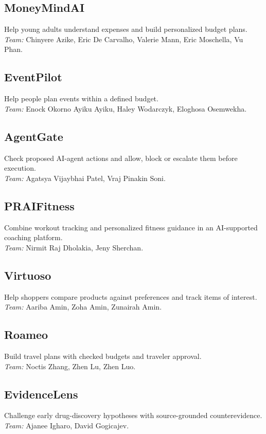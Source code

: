 \documentclass[sigconf,nonacm]{acmart}
\begin{document}
\subsection*{MoneyMindAI}
Help young adults understand expenses and build personalized budget plans.\\
\textit{Team:} Chinyere Azike, Eric De Carvalho, Valerie Mann, Eric Moschella, Vu Phan.

\subsection*{EventPilot}
Help people plan events within a defined budget.\\
\textit{Team:} Enock Okorno Ayiku Ayiku, Haley Wodarczyk, Eloghosa Osemwekha.

\subsection*{AgentGate}
Check proposed AI-agent actions and allow, block or escalate them before execution.\\
\textit{Team:} Agatsya Vijaybhai Patel, Vraj Pinakin Soni.

\subsection*{PRAIFitness}
Combine workout tracking and personalized fitness guidance in an AI-supported coaching platform.\\
\textit{Team:} Nirmit Raj Dholakia, Jeny Sherchan.

\subsection*{Virtuoso}
Help shoppers compare products against preferences and track items of interest.\\
\textit{Team:} Aariba Amin, Zoha Amin, Zunairah Amin.

\subsection*{Roameo}
Build travel plans with checked budgets and traveler approval.\\
\textit{Team:} Noctis Zhang, Zhen Lu, Zhen Luo.

\subsection*{EvidenceLens}
Challenge early drug-discovery hypotheses with source-grounded counterevidence.\\
\textit{Team:} Ajanee Igharo, David Gogicajev.

\endgroup
\end{document}
